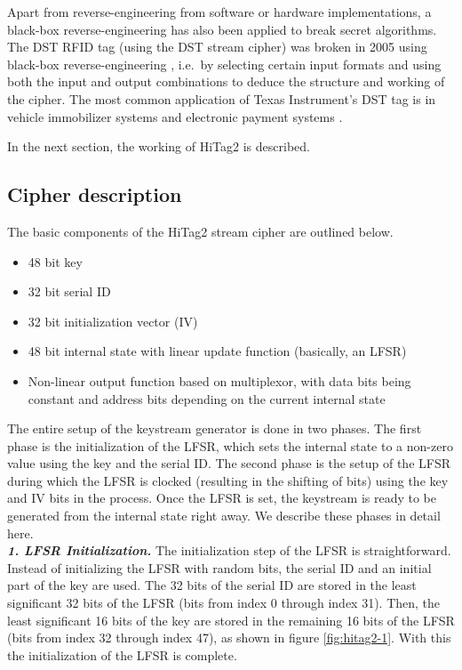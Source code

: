 Apart from reverse-engineering from software or hardware implementations, a black-box reverse-engineering has also been applied to break secret algorithms. The DST RFID tag (using the DST stream cipher) was broken in 2005 using black-box reverse-engineering \cite{bono2005sac}, i.e.~by selecting certain input formats and using both the input and output combinations to deduce the structure and working of the cipher. The most common application of Texas Instrument's DST tag is in vehicle immobilizer systems and electronic payment systems \cite{dst-rfid-analysis}. 

In the next section, the working of HiTag2 is described.

\subsection{Cipher description}
\label{sec:hitag2-cipher-description}
The basic components of the HiTag2 stream cipher are outlined below.
\begin{itemize}
\item 48 bit key
\item 32 bit serial ID
\item 32 bit initialization vector (IV)
\item 48 bit internal state with linear update function (basically, an LFSR)
\item Non-linear output function based on multiplexor, with data bits being constant and address bits depending on the current internal state
\end{itemize}

The entire setup of the keystream generator is done in two phases. The first phase is the initialization of the LFSR, which sets the internal state to a non-zero value using the key and the serial ID. The second phase is the setup of the LFSR during which the LFSR is clocked (resulting in the shifting of bits) using the key and IV bits in the process. Once the LFSR is set, the keystream is ready to be generated from the internal state right away. We describe these phases in detail here.\\ 

\noindent \textit{\textbf{1. LFSR Initialization.}} The initialization step of the LFSR is straightforward. Instead of initializing the LFSR with random bits, the serial ID and an initial part of the key are used. The 32 bits of the serial ID are stored in the least significant 32 bits of the LFSR (bits from index 0 through index 31). Then, the least significant 16 bits of the key are stored in the remaining 16 bits of the LFSR (bits from index 32 through index 47), as shown in figure \ref{fig:hitag2-1}. With this the initialization of the LFSR is complete.\\

